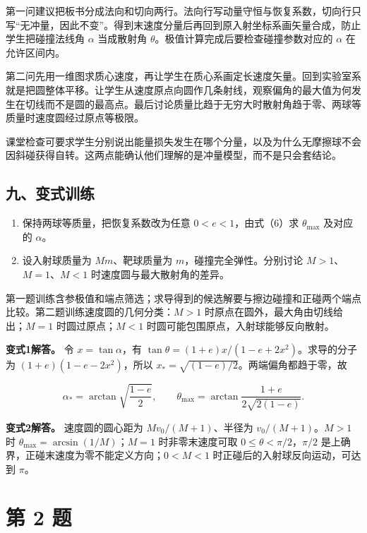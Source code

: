 \documentclass[12pt,a4paper,UTF8]{ctexart}
\newcommand{\tightlist}{\setlength{\itemsep}{0pt}\setlength{\parskip}{0pt}}
\begin{document}
第一问建议把板书分成法向和切向两行。法向行写动量守恒与恢复系数，切向行只写``无冲量，因此不变''。得到末速度分量后再回到原入射坐标系画矢量合成，防止学生把碰撞法线角
\(\alpha\) 当成散射角 \(\theta\)。极值计算完成后要检查碰撞参数对应的
\(\alpha\) 在允许区间内。

第二问先用一维图求质心速度，再让学生在质心系画定长速度矢量。回到实验室系就是把圆整体平移。让学生从速度原点向圆作几条射线，观察偏角的最大值为何发生在切线而不是圆的最高点。最后讨论质量比趋于无穷大时散射角趋于零、两球等质量时速度圆经过原点等极限。

课堂检查可要求学生分别说出能量损失发生在哪个分量，以及为什么无摩擦球不会因斜碰获得自转。这两点能确认他们理解的是冲量模型，而不是只会套结论。

\subsection{九、变式训练}\label{ux4e5dux53d8ux5f0fux8badux7ec3}

\begin{enumerate}
\def\labelenumi{\arabic{enumi}.}
\tightlist
\item
  保持两球等质量，把恢复系数改为任意 \(0<e<1\)，由式（6）求
  \(\theta_{\max}\) 及对应的 \(\alpha\)。
\item
  设入射球质量为 \(Mm\)、靶球质量为 \(m\)，碰撞完全弹性。分别讨论
  \(M>1\)、\(M=1\)、\(M<1\) 时速度圆与最大散射角的差异。
\end{enumerate}

第一题训练含参极值和端点筛选；求导得到的候选解要与擦边碰撞和正碰两个端点比较。第二题训练速度圆的几何分类：\(M>1\)
时原点在圆外，最大角由切线给出；\(M=1\) 时圆过原点；\(M<1\)
时圆可能包围原点，入射球能够反向散射。

\textbf{变式1解答。} 令 \(x=\tan\alpha\)，有
\(\tan\theta=(1+e)x/(1-e+2x^2)\)。求导的分子为 \((1+e)(1-e-2x^2)\)，所以
\(x_* =\sqrt{(1-e)/2}\)。两端偏角都趋于零，故

\[\alpha_*=\arctan\sqrt{\frac{1-e}{2}},\qquad \theta_{\max}=\arctan\frac{1+e}{2\sqrt{2(1-e)}}.\]

\textbf{变式2解答。} 速度圆的圆心距为 \(Mv_0/(M+1)\)、半径为
\(v_0/(M+1)\)。\(M>1\) 时 \(\theta_{\max}=\arcsin(1/M)\)；\(M=1\)
时非零末速度可取 \(0\le\theta<\pi/2\)，\(\pi/2\)
是上确界，正碰末速度为零不能定义方向；\(0<M<1\)
时正碰后的入射球反向运动，可达到 \(\pi\)。

\newpage

\section{第 2 题}\label{ux7b2c-2-ux9898}
\end{document}
